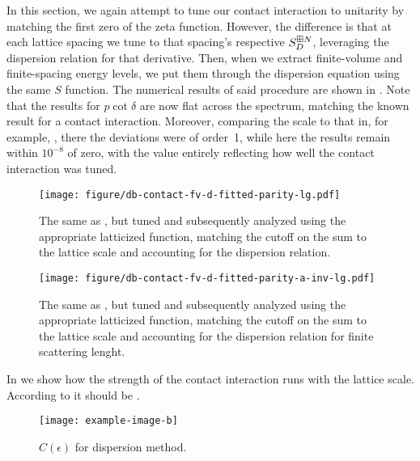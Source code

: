 In this section, we again attempt to tune our contact interaction to unitarity by matching the first zero of the \Luscher zeta function.
However, the difference is that at each lattice spacing we tune to that spacing's respective $S^{\boxplus N}_D$, leveraging the dispersion relation for that derivative.
Then, when we extract finite-volume and finite-spacing energy levels, we put them through the dispersion equation  using the same $S$ function.
The numerical results of said procedure are shown in .
Note that the results for $p\cot\delta$ are now flat across the spectrum, matching the known result for a contact interaction.
Moreover, comparing the scale to that in, for example, , there the deviations were of order~1, while here the results remain within $10^{-8}$ of zero, with the value entirely reflecting how well the contact interaction was tuned.

\begin{figure}
    \texttt{[image: figure/db-contact-fv-d-fitted-parity-lg.pdf]}
    \caption{The same as , but tuned and subsequently analyzed using the appropriate latticized \Luscher function, matching the cutoff on the sum to the lattice scale and accounting for the dispersion relation.}
    \label{fig:unimproved dispersion}
\end{figure}

\begin{figure}[th]
    \texttt{[image: figure/db-contact-fv-d-fitted-parity-a-inv-lg.pdf]}
    \caption{The same as , but tuned and subsequently analyzed using the appropriate latticized \Luscher function, matching the cutoff on the sum to the lattice scale and accounting for the dispersion relation for finite scattering lenght.}
    \label{fig:unimproved dispersion finite a}
\end{figure}

In  we show how the strength of the contact interaction runs with the lattice scale.  According to  it should be .

\begin{figure}
    \texttt{[image: example-image-b]}
    \caption{$C(\epsilon)$ for dispersion method.  }
    \label{fig:running of strength}
\end{figure}
